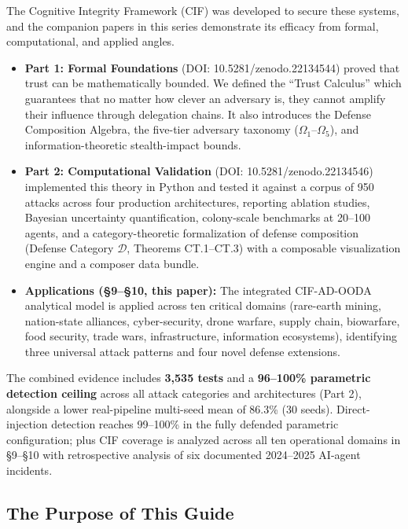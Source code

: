 \documentclass[
]{article}
\providecommand{\tightlist}{%
  \setlength{\itemsep}{0pt}\setlength{\parskip}{0pt}}
\newcommand{\calD}{\mathcal{D}}
\begin{document}
The Cognitive Integrity Framework (CIF) was developed to secure these
systems, and the companion papers in this series demonstrate its
efficacy from formal, computational, and applied angles.

\begin{itemize}
\tightlist
\item
  \textbf{Part 1: Formal Foundations} (DOI: 10.5281/zenodo.22134544)
  proved that trust can be mathematically bounded. We defined the
  ``Trust Calculus'' which guarantees that no matter how clever an
  adversary is, they cannot amplify their influence through delegation
  chains. It also introduces the Defense Composition Algebra, the
  five-tier adversary taxonomy (\(\Omega_1\)--\(\Omega_5\)), and
  information-theoretic stealth-impact bounds.
\item
  \textbf{Part 2: Computational Validation} (DOI:
  10.5281/zenodo.22134546) implemented this theory in Python and tested
  it against a corpus of 950 attacks across four production
  architectures, reporting ablation studies, Bayesian uncertainty
  quantification, colony-scale benchmarks at 20--100 agents, and a
  category-theoretic formalization of defense composition (Defense
  Category \(\calD\), Theorems CT.1--CT.3) with a composable
  visualization engine and a composer data bundle.
\item
  \textbf{Applications (§9--§10, this paper):} The integrated
  CIF-AD-OODA analytical model is applied across ten critical domains
  (rare-earth mining, nation-state alliances, cyber-security, drone
  warfare, supply chain, biowarfare, food security, trade wars,
  infrastructure, information ecosystems), identifying three universal
  attack patterns and four novel defense extensions.
\end{itemize}

The combined evidence includes \textbf{3,535 tests} and a
\textbf{96--100\% parametric detection ceiling} across all attack
categories and architectures (Part 2), alongside a lower real-pipeline
multi-seed mean of 86.3\% (30 seeds). Direct-injection detection reaches
99--100\% in the fully defended parametric configuration; plus CIF
coverage is analyzed across all ten operational domains in §9--§10 with
retrospective analysis of six documented 2024--2025 AI-agent incidents.

\subsection{The Purpose of This Guide}\label{the-purpose-of-this-guide}
\end{document}
